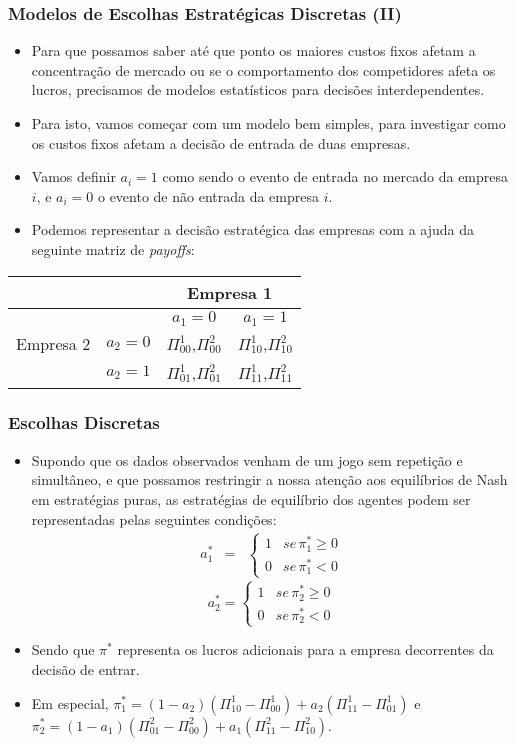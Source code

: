 \documentclass{beamer}
\begin{document}
\begin{frame}\frametitle{Modelos de Escolhas Estratégicas Discretas (II)}
\small
\begin{itemize}
\item Para que possamos saber até que ponto os maiores custos fixos afetam
a concentração de mercado ou se o comportamento dos competidores afeta
os lucros, precisamos de modelos estatísticos para decisões interdependentes.
\item Para isto, vamos começar com um modelo bem simples, para investigar
como os custos fixos afetam a decisão de entrada de duas empresas.
\item Vamos definir $a_{i}=1$ como sendo o evento de entrada no mercado
da empresa $i$, e $a_{i}=0$ o evento de não entrada da empresa $i$. 
\item Podemos representar a decisão estratégica das empresas com a ajuda
da seguinte matriz de \emph{payoffs}:
\end{itemize}
\begin{center}
\begin{tabular}{|c|c|c|c|}
\hline 
 &  & \multicolumn{2}{c|}{Empresa 1}\tabularnewline
\hline 
\hline 
 &  & $a_{1}=0$ & $a_{1}=1$\tabularnewline
\hline 
Empresa 2 & $a_{2}=0$ & $\Pi_{00}^{1}$,$\Pi_{00}^{2}$ & $\Pi_{10}^{1}$,$\Pi_{10}^{2}$\tabularnewline
\hline 
 & $a_{2}=1$ & $\Pi_{01}^{1}$,$\Pi_{01}^{2}$ & $\Pi_{11}^{1}$,$\Pi_{11}^{2}$\tabularnewline
\hline 
\end{tabular}
\par\end{center}

\end{frame}

\begin{frame}\frametitle{Escolhas Discretas}
\small
\begin{itemize}
\item Supondo que os dados observados venham de um jogo sem repetição e
simultâneo, e que possamos restringir a nossa atenção aos equilíbrios
de Nash em estratégias puras, as estratégias de equilíbrio dos agentes
podem ser representadas pelas seguintes condições:
\begin{eqnarray*}
a_{1}^{*} & = & \left\{ \begin{array}{cc}
1 & se\,\pi_{1}^{*}\geq0\\
0 & se\,\pi_{1}^{*}<0
\end{array}\right.
\end{eqnarray*}
\[
a_{2}^{*}=\left\{ \begin{array}{cc}
1 & se\,\pi_{2}^{*}\geq0\\
0 & se\,\pi_{2}^{*}<0
\end{array}\right.
\]
\item Sendo que $\pi^{*}$ representa os lucros adicionais para a empresa
decorrentes da decisão de entrar. 
\item Em especial, $\pi_{1}^{*}=(1-a_{2})(\Pi_{10}^{1}-\Pi_{00}^{1})+a_{2}(\Pi_{11}^{1}-\Pi_{01}^{1})$
e $\pi_{2}^{*}=(1-a_{1})(\Pi_{01}^{2}-\Pi_{00}^{2})+a_{1}(\Pi_{11}^{2}-\Pi_{10}^{2})$. 
\end{itemize}
\end{frame}
\end{document}
